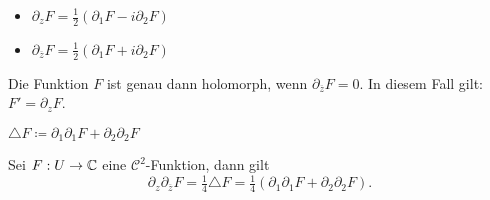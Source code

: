 \documentclass{cheat-sheet}
\newcommand{\Cont}{\mathcal{C}} %
\begin{document}
\begin{nota}
  \begin{minipage}[t]{0.5 \linewidth}
    \begin{itemize}
      \item $\partial_{z} F = \tfrac{1}{2} (\partial_1 F - i \partial_2 F)$
      \item $\partial_{\overline{z}} F = \tfrac{1}{2} (\partial_1 F + i \partial_2 F)$
    \end{itemize}
  \end{minipage}
\end{nota}

\begin{lem}
  Die Funktion $F$ ist genau dann holomorph, wenn $\partial_{\overline{z}} F = 0$. In diesem Fall gilt: $F' = \partial_z F$.
\end{lem}

\begin{nota}
  $\triangle F \coloneqq \partial_1 \partial_1 F + \partial_2 \partial_2 F$
\end{nota}

\begin{lem}
  Sei $F : U \to \mathbb{C}$ eine $\Cont^2$-Funktion, dann gilt
  \[ \partial_z \partial_{\overline{z}} F = \tfrac{1}{4} \triangle F = \tfrac{1}{4} (\partial_1 \partial_1 F + \partial_2 \partial_2 F). \]
\end{lem}




\end{document}
